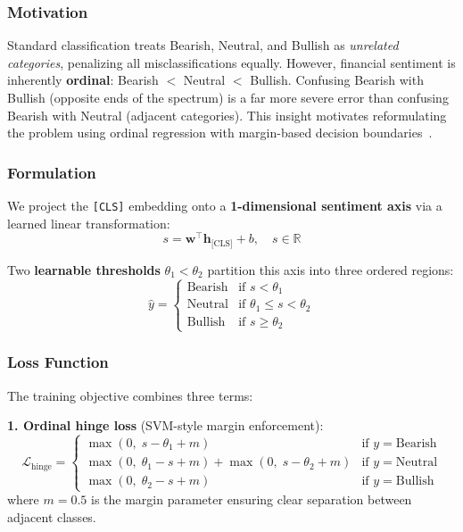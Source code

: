 \documentclass[11pt,a4paper]{article}
\begin{document}
\subsubsection{Motivation}

Standard classification treats Bearish, Neutral, and Bullish as \textit{unrelated categories}, penalizing all misclassifications equally. However, financial sentiment is inherently \textbf{ordinal}: Bearish $<$ Neutral $<$ Bullish. Confusing Bearish with Bullish (opposite ends of the spectrum) is a far more severe error than confusing Bearish with Neutral (adjacent categories). This insight motivates reformulating the problem using ordinal regression with margin-based decision boundaries~\cite{ordinal2024finnlp,ordinal2025econlp}.

\subsubsection{Formulation}

We project the \texttt{[CLS]} embedding onto a \textbf{1-dimensional sentiment axis} via a learned linear transformation:
\begin{equation}
    s = \mathbf{w}^\top \mathbf{h}_{\text{[CLS]}} + b, \quad s \in \mathbb{R}
\end{equation}

Two \textbf{learnable thresholds} $\theta_1 < \theta_2$ partition this axis into three ordered regions:
\begin{equation}
    \hat{y} = \begin{cases}
        \text{Bearish} & \text{if } s < \theta_1 \\
        \text{Neutral} & \text{if } \theta_1 \leq s < \theta_2 \\
        \text{Bullish} & \text{if } s \geq \theta_2
    \end{cases}
\end{equation}

\subsubsection{Loss Function}

The training objective combines three terms:

\textbf{1. Ordinal hinge loss} (SVM-style margin enforcement):
\begin{equation}
    \mathcal{L}_{\text{hinge}} = \begin{cases}
        \max(0,\; s - \theta_1 + m) & \text{if } y = \text{Bearish} \\
        \max(0,\; \theta_1 - s + m) + \max(0,\; s - \theta_2 + m) & \text{if } y = \text{Neutral} \\
        \max(0,\; \theta_2 - s + m) & \text{if } y = \text{Bullish}
    \end{cases}
\end{equation}
where $m=0.5$ is the margin parameter ensuring clear separation between adjacent classes.
\end{document}
